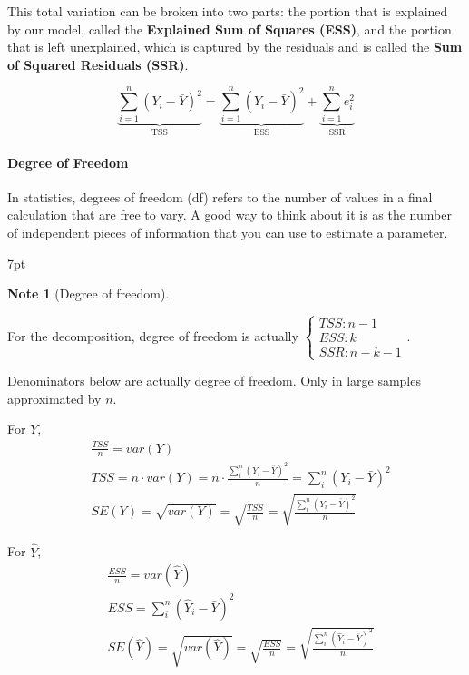 \documentclass{article}
\newenvironment{blueblock}{
\def\FrameCommand{
  \hspace{1pt}
    {\color{DarkBlue}
    \vrule width 2pt}
    {\color{blueshade}
    \vrule width 4pt}
  \colorbox{blueshade}
}
\MakeFramed{
  \advance
  \hsize-
  \width
  \FrameRestore}
\noindent\hspace{-4.55pt}%
\begin{adjustwidth}{}{7pt}
\vspace{2pt}\vspace{2pt}
}
{\vspace{2pt}\end{adjustwidth}\endMakeFramed}
\newtheorem{note}{Note}
\begin{document}
This total variation can be broken into two parts: the portion that is explained by our model, called the \textbf{Explained Sum of Squares (ESS)}, and the portion that is left unexplained, which is captured by the residuals and is called the \textbf{Sum of Squared Residuals (SSR)}.

\begin{equation}
    \underbrace{\sum_{i=1}^n (Y_i - \bar Y)^2}_{\text{TSS}} = \underbrace{\sum_{i=1}^n (\hat Y_i - \bar Y)^2}_{\text{ESS}} + \underbrace{\sum_{i=1}^n e_i^2}_{\text{SSR}}
\end{equation}


\paragraph{Degree of Freedom} 

In statistics, degrees of freedom (df) refers to the number of values in a final calculation that are free to vary. A good way to think about it is as the number of independent pieces of information that you can use to estimate a parameter.

\begin{blueblock}
\begin{note}[Degree of freedom]
\end{note}
For the decomposition, degree of freedom is actually $\begin{cases}
 TSS: n-1\\
 ESS: k\\
 SSR: n-k-1
\end{cases}$.

Denominators below are actually degree of freedom. Only in large samples approximated by $n$.
\end{blueblock}

For $Y$,
\begin{align}
&\frac{TSS}{n}=var(Y)
\\& TSS=n \cdot var(Y)=n \cdot \frac{\sum\limits_i^n (Y_i-\bar Y)^2}{n}=\sum\limits_i^n (Y_i-\bar Y)^2
\\& SE(Y)=\sqrt{var(Y)}=\sqrt{\frac{TSS}{n}}=\sqrt{\frac{\sum\limits_i^n (Y_i-\bar Y)^2}{n}}
\end{align}

For $\hat Y$,
\begin{align}
&\frac{ESS}{n}=var(\hat Y)
\\&ESS=\sum\limits_i^n (\hat Y_i-\bar Y)^2
\\&SE(\hat Y)=\sqrt{var(\hat Y)}=\sqrt{\frac{ESS}{n}}=\sqrt{\frac{\sum\limits_i^n (\hat Y_i-\bar Y)^2}{n}}
\end{align}
\end{document}
